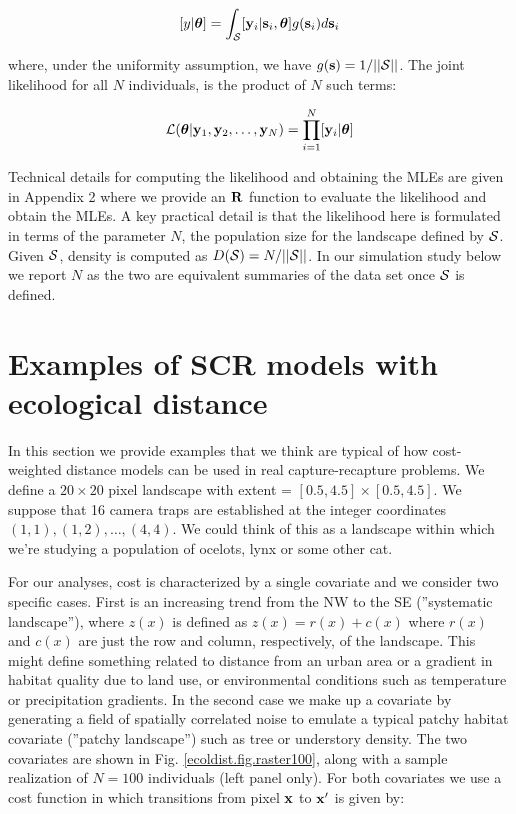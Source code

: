 \documentclass[12pt]{article}
\begin{document}
\begin{spacing}{1.8}
\[
  [y|{\bm \theta}] =
\int_{{\cal S}}  [ {\bf y}_{i} |{\bf s}_{i},{\bm \theta}] g({\bf s}_{i}) d{\bf s}_{i}
\]

{\flushleft where}, under the uniformity assumption, we have
$g({\bf s}) = 1/||{\cal S}||$.
The joint likelihood for all $N$ individuals, 
is the product of $N$ such terms:

\[
{\cal L}({\bm \theta} | {\bf y}_{1},{\bf y}_{2},\ldots, {\bf y}_{N}) = \prod_{i=1}^{N}
[{\bf y}_{i}|{\bm \theta}]
\]

Technical details for computing the likelihood and obtaining the MLEs
are given in Appendix 2 where we provide an ${\bf R}$ function
to evaluate the likelihood and obtain the MLEs.
A key practical detail is that the likelihood here is formulated in
terms of the parameter $N$, the population size for the landscape
defined by ${\cal S}$. Given ${\cal S}$, density
is
computed as $D({\cal S}) = N/||{\cal S}||$. In our simulation study
below we report $N$ as the two are equivalent summaries of the data
set once ${\cal S}$ is defined.


\section{Examples of SCR models with ecological distance}

In this section we provide examples that we think are typical of how
cost-weighted distance models can be used in real capture-recapture
problems.  We define a $20 \times 20$ pixel landscape with 
extent = $[0.5, 4.5] \times [0.5, 4.5]$.  
We suppose that 16 camera traps are established at the integer coordinates
$(1,1), (1,2), \ldots, (4,4)$. We could think of this as a landscape
within which we're studying a population of ocelots, lynx or some
other cat.

For our analyses, cost is characterized by a single covariate 
and we consider two specific cases. First is an increasing trend from
the NW to the SE (''systematic landscape''), where $z(x)$ is defined as
$z(x) = r(x) + c(x)$ where $r(x)$ and $c(x)$ are just the row and
column, respectively, of the landscape.  This might define something
related to distance from an urban area or a gradient in habitat
quality due to land use, or environmental conditions such as
temperature or precipitation gradients.  In the second case we make up
a covariate by generating a field of spatially correlated noise to
emulate a typical patchy habitat covariate (''patchy landscape'') such as
tree or understory density. The two covariates are shown in
Fig. \ref{ecoldist.fig.raster100}, along with a sample realization of
$N=100$ individuals (left panel only).  For both covariates we use a
cost function in which transitions from pixel ${\bf x}$ to ${\bf x}'$
is given by:


\end{spacing}
\end{document}
